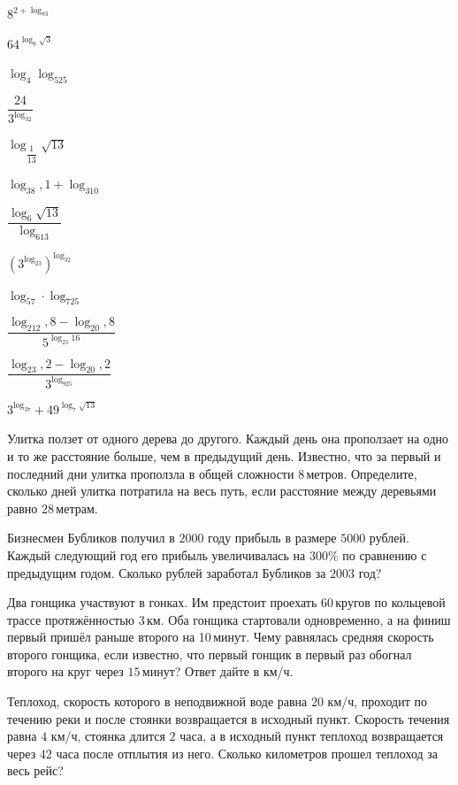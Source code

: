 \begin{class}[number=6]
\begin{listofex}
\begin{enumcols}[itemcolumns=3]
			\item \( 8^{2+\log_83} \)
			\item \( 64^{\log_8\sqrt{3}} \)
			\item \( \log_4\log_525 \)
			\item \( \dfrac{24}{3^{\log_32}} \)
			\item \( \log_{\dfrac{1}{13}}\sqrt{13} \)
			\item \( \log_38,1+\log_310 \)
			\item \( \dfrac{\log_6\sqrt{13}}{\log_613} \)
			\item \( \left( 3^{\log_23} \right)^{\log_32}\)
			\item \( \log_57\cdot\log_725 \)
			\item \( \dfrac{\log_212,8-\log_20,8}{5^{\log_{25}16}} \)
			\item \( \dfrac{\log_23,2-\log_20,2}{3^{\log_925}} \)
			\item \( 3^{\log_37}+49^{\log_7{\sqrt{13}}} \)
		\end{enumcols}
		\item Улитка ползет от одного дерева до другого. Каждый день она проползает на одно и то же расстояние больше, чем в предыдущий день. Известно, что за первый и последний дни улитка проползла в общей сложности \( 8 \) метров. Определите, сколько дней улитка потратила на весь путь, если расстояние между деревьями равно \( 28 \) метрам.
		\item Бизнесмен Бубликов получил в \( 2000 \) году прибыль в размере \( 5000  \) рублей. Каждый следующий год его прибыль увеличивалась на \( 300\% \) по сравнению с предыдущим годом. Сколько рублей заработал Бубликов за \( 2003 \) год?
		\item Два гонщика участвуют в гонках. Им предстоит проехать 60 кругов по кольцевой трассе протяжённостью \( 3 \) км. Оба гонщика стартовали одновременно, а на финиш первый пришёл раньше второго на 10 минут. Чему равнялась средняя скорость второго гонщика, если известно, что первый гонщик в первый раз обогнал второго на круг через \( 15 \) минут? Ответ дайте в км/ч.
		\item Теплоход, скорость которого в неподвижной воде равна \( 20 \) км/ч, проходит по течению реки и после стоянки возвращается в исходный пункт. Скорость течения равна \( 4 \) км/ч, стоянка длится \( 2 \) часа, а в исходный пункт теплоход возвращается через \( 42 \) часа после отплытия из него. Сколько километров прошел теплоход за весь рейс?
	\end{listofex}
\end{class}

